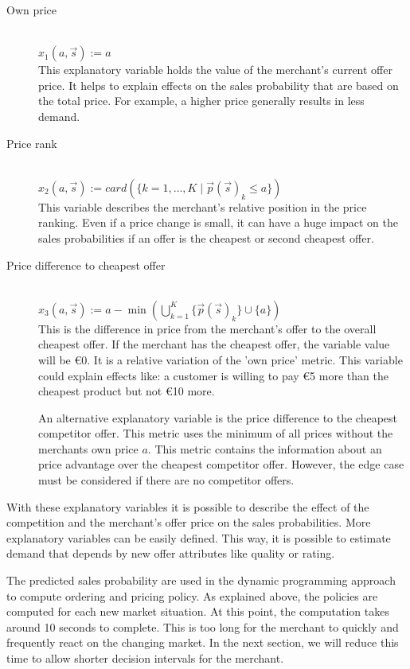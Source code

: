 \begin{description}
	\item [Own price] \hfill \\
		$x_1(a, \vec{s}) := a$ \\
		This explanatory variable holds the value of the merchant's current offer price.
		It helps to explain effects on the sales probability that are based on the total price.
		For example, a higher price generally results in less demand.
	\item [Price rank] \hfill \\
		$x_2(a, \vec{s}) := card(\{k=1,\ldots, K \mid \vec{p}(\vec{s})_k \leq a\})$ \\
		This variable describes the merchant's relative position in the price ranking.
		Even if a price change is small, it can have a huge impact on the sales probabilities if an offer is the cheapest or second cheapest offer.
	\item [Price difference to cheapest offer] \hfill \\
		$x_3(a, \vec{s}) := a - \min( \bigcup_{k=1}^K\{\vec{p}(\vec{s})_k\} \cup \{a\})$ \\
		This is the difference in price from the merchant's offer to the overall cheapest offer.
		If the merchant has the cheapest offer, the variable value will be €0.
		It is a relative variation of the 'own price' metric.
		This variable could explain effects like: a customer is willing to pay €5 more than the cheapest product but not €10 more.
		
		An alternative explanatory variable is the price difference to the cheapest competitor offer. This metric uses the minimum of all prices without the merchants own price $a$.
		This metric contains the information about an price advantage over the cheapest competitor offer.
		However, the edge case must be considered if there are no competitor offers.
\end{description}

With these explanatory variables it is possible to describe the effect of the competition and the merchant's offer price on the sales probabilities.
More explanatory variables can be easily defined.
This way, it is possible to estimate demand that depends by new offer attributes like quality or rating.

The predicted sales probability are used in the dynamic programming approach to compute ordering and pricing policy.
As explained above, the policies are computed for each new market situation.
At this point, the computation takes around 10 seconds to complete.
This is too long for the merchant to quickly and frequently react on the changing market.
In the next section, we will reduce this time to allow shorter decision intervals for the merchant.

